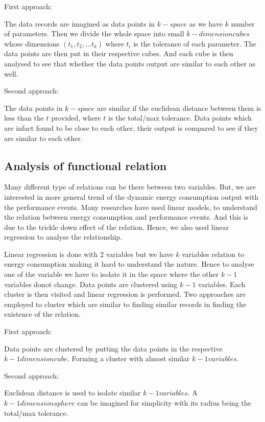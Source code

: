 First approach:

The data records are imagined as data points in \(k-space\) as we have \(k\) number of parameters. Then we divide the whole space into small \(k-dimension cubes\) whose dimensions \((t_1, t_2, \ldots t_k)\) where \(t_i\) is the tolerance of each parameter. The data points are then put in their respective cubes. And each cube is then analysed to see that whether the data points output are similar to each other as well.

Second approach:

The data points in \(k-space\) are similar if the euclidean distance between them is less than the \(t\) provided, where \(t\) is the total/max tolerance. Data points which are infact found to be close to each other, their output is compared to see if they are similar to each other.

\subsection{Analysis of functional relation}

Many different type of relations can be there between two variables. But, we are interested in more general trend of the dynamic energy consumption output with the performance events. Many researches have used linear models, to understand the relation between energy consumption and performance events.\cite{o2017survey} And this is due to the trickle down effect of the relation.\cite{bircher2007complete} Hence, we also used linear regression to analyse the relationship.

Linear regression is done with 2 variables but we have \(k\) variables relation to energy consumption making it hard to understand the nature. Hence to analyse one of the variable we have to isolate it in the space where the other \(k-1\) variables donot change. Data points are clustered using \(k-1\) variables. Each cluster is then visited and linear regression is performed. Two approaches are employed to cluster which are similar to finding similar records in finding the existence of the relation.

First approach:

Data points are clustered by putting the data points in the respective \(k-1 dimension cube\). Forming a cluster with almost similar \(k-1 variables\).

Second approach:

Euclidean distance is used to isolate similar \(k-1 variables\). A \(k-1 dimension sphere\) can be imagined for simplicity with its radius being the total/max tolerance.

